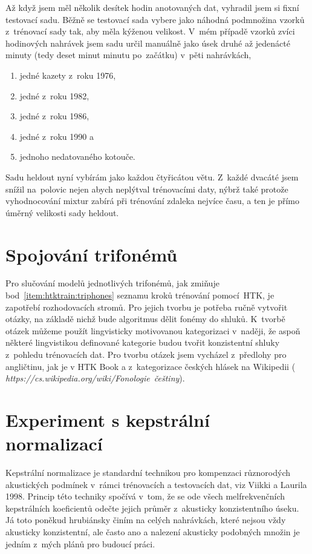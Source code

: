 Až když jsem měl několik desítek hodin anotovaných dat, vyhradil jsem si fixní
testovací sadu. Běžně se testovací sada vybere jako náhodná podmnožina vzorků
z~trénovací sady tak, aby měla kýženou velikost. V~mém případě vzorků zvíci
hodinových nahrávek jsem sadu určil manuálně jako úsek druhé až jedenácté minuty
(tedy deset minut minutu po~začátku) v~pěti nahrávkách,
\begin{enumerate}
\item{jedné kazety z~roku 1976,}
\item{jedné z~roku 1982,}
\item{jedné z~roku 1986,}
\item{jedné z~roku 1990 a}
\item{jednoho nedatovaného kotouče.}
\end{enumerate}

Sadu heldout nyní vybírám jako každou čtyřicátou větu. Z~každé dvacáté jsem
snížil na~polovic nejen abych neplýtval trénovacími daty, nýbrž také protože
vyhodnocování mixtur zabírá při trénování zdaleka nejvíce času, a ten je přímo
úměrný velikosti sady heldout.

\section{Spojování trifonémů}

Pro slučování modelů jednotlivých trifonémů, jak zmiňuje
bod~\ref{item:htktrain:triphones} seznamu kroků trénování pomocí~HTK, je
zapotřebí rozhodovacích stromů. Pro jejich tvorbu je potřeba ručně vytvořit
otázky, na základě nichž bude algoritmus dělit fonémy do shluků. K~tvorbě
otázek můžeme použít lingvisticky motivovanou kategorizaci v~naději, že aspoň
některé lingvistikou definované kategorie budou tvořit konzistentní shluky
z~pohledu trénovacích dat. Pro tvorbu otázek jsem vycházel z~předlohy pro
angličtinu, jak je v HTK Book a z~kategorizace českých hlásek na Wikipedii ({\em
https://cs.wikipedia.org/wiki/Fonologie~češtiny}).

\section{Experiment s kepstrální normalizací}
\label{sec:mfcc-norm}

Kepstrální normalizace je standardní technikou pro kompenzaci různorodých
akustických podmínek v~rámci trénovacích a testovacích dat, viz Viikki a Laurila
1998\cite{viikki1998cepstral}. Princip této techniky spočívá v~tom, že se ode
všech melfrekvenčních kepstrálních koeficientů odečte jejich průměr z~akusticky
konzistentního úseku. Já toto poněkud hrubiánsky činím na celých nahrávkách,
které nejsou vždy akusticky konzistentní, ale často ano a nalezení akusticky
podobných množin je jedním z~mých plánů pro budoucí práci.


